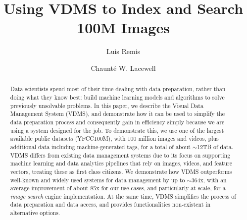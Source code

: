 \documentclass[sigconf, nonacm]{acmart}
\begin{document}
\title{Using VDMS to Index and Search 100M Images}

\author{Luis Remis}

\author{Chaunt\'e W. Lacewell}

\begin{abstract}
Data scientists spend most of their time dealing with data preparation,
rather than doing what they know best:
build machine learning models and algorithms to solve previously unsolvable problems.
In this paper, we describe the Visual Data Management System (VDMS),
and demonstrate how it can be used to simplify the data preparation process
and consequently gain in efficiency simply because
we are using a system designed for the job.
To demonstrate this, we use one of the largest available
public datasets (YFCC100M),
with 100 million images and videos, plus additional data including
machine-generated tags, for a total of about $\sim$12TB of data.
VDMS differs from existing data management systems
due to its focus on supporting machine learning and
data analytics pipelines that rely on images, videos, and feature vectors,
treating these as first class citizens.
We demonstrate how VDMS outperforms well-known and widely used
systems for data management by up to $\sim$364x, with
an average improvement of about 85x for our use-cases, and particularly at scale,
for a \textit{image search} engine implementation.
At the same time, VDMS simplifies the process of data preparation and data access,
and provides functionalities non-existent in alternative options.
\end{abstract}

\maketitle
\end{document}
